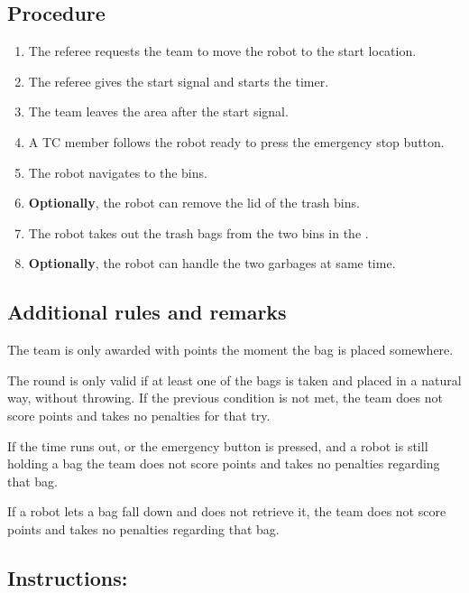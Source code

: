 \subsection*{Procedure}

\begin{enumerate}
	\item The referee requests the team to move the robot to the start location.
	\item The referee gives the start signal and starts the timer.
	\item The team leaves the area after the start signal.
	\item A TC member follows the robot ready to press the emergency stop button.
	\item The robot navigates to the bins.
	\item \textbf{Optionally}, the robot can remove the lid of the trash bins.
	\item The robot takes out the trash bags from the two bins in the \Arena{}.
	\item \textbf{Optionally}, the robot can handle the two garbages at same time.

\end{enumerate}

\subsection*{Additional rules and remarks}

	The team is only awarded with points the moment the bag is placed somewhere.

	The round is only valid if at least one of the bags is taken and placed in a natural way, without throwing. If the previous condition is not met, the team does not score points and takes no penalties for that try.

	If the time runs out, or the emergency button is pressed, and a robot is still holding a bag the team does not score points and takes no penalties regarding that bag.

	If a robot lets a bag fall down and does not retrieve it, the team does not score points and takes no penalties regarding that bag.


\subsection*{Instructions:}

